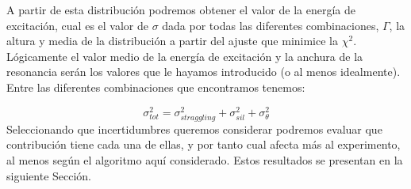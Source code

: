 \begin{enumerate}
    A partir de esta distribución podremos obtener el valor de la energía de excitación, cual es el valor de $\sigma$ dada por todas las diferentes combinaciones, $\Gamma$, la altura y media de la distribución a partir del ajuste que minimice la $\chi^2$. Lógicamente el valor medio de la energía de excitación y la anchura de la resonancia serán los valores que le hayamos introducido (o al menos idealmente). Entre las diferentes combinaciones que encontramos tenemos:
    
    \begin{equation}
        \sigma_{tot}^2 = \sigma_{straggling}^2 + \sigma_{sil}^2 + \sigma_{\theta}^2 
    \end{equation}
    Seleccionando que incertidumbres queremos considerar podremos evaluar que contribución tiene cada una de ellas, y por tanto cual afecta más al experimento, al menos según el algoritmo aquí considerado. Estos resultados se presentan en la siguiente Sección.

\end{enumerate}    
